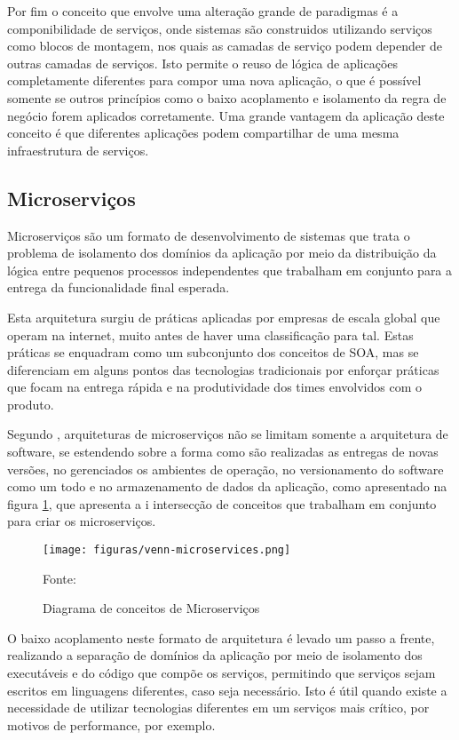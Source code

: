 Por fim o conceito que envolve uma alteração grande de paradigmas é a
componibilidade de serviços, onde sistemas são construidos utilizando serviços
como blocos de montagem, nos quais as camadas de serviço podem depender de
outras camadas de serviços. Isto permite o reuso de lógica de aplicações
completamente diferentes para compor uma nova aplicação, o que é possível
somente se outros princípios como o baixo acoplamento e isolamento da regra de
negócio forem aplicados corretamente. Uma grande vantagem da aplicação deste
conceito é que diferentes aplicações podem compartilhar de uma mesma
infraestrutura de serviços.

\subsection{Microserviços}

Microserviços são um formato de desenvolvimento de sistemas que trata o
problema de isolamento dos domínios da aplicação por meio da distribuição
da lógica entre pequenos processos independentes que trabalham em conjunto
para a entrega da funcionalidade final esperada.

Esta arquitetura surgiu de práticas aplicadas por empresas de escala global que
operam na internet, muito antes de haver uma classificação para tal. Estas
práticas se enquadram como um subconjunto dos conceitos de \ac{SOA}, mas se
diferenciam em alguns pontos das tecnologias tradicionais por enforçar práticas
que focam na entrega rápida e na produtividade dos times envolvidos com
o produto.

Segundo , arquiteturas de microserviços não se limitam
somente a arquitetura de software, se estendendo sobre a forma como são
realizadas as entregas de novas versões, no gerenciados os ambientes
de operação, no versionamento do software como um todo e no armazenamento de
dados da aplicação, como apresentado na figura \ref{fig:venn-microservices},
que apresenta a i intersecção de conceitos que trabalham em conjunto para criar
os microserviços.

\begin{figure}[H]
	\centering
	\caption{Diagrama de conceitos de Microserviços}
	\texttt{[image: figuras/venn-microservices.png]}

	\label{fig:venn-microservices}
	\footnotesize Fonte: 
\end{figure}

O baixo acoplamento neste formato de arquitetura é levado um passo a frente,
realizando a separação de domínios da aplicação por meio de isolamento dos
executáveis e do código que compõe os serviços, permitindo que serviços
sejam escritos em linguagens diferentes, caso seja necessário. Isto é útil
quando existe a necessidade de utilizar tecnologias diferentes em um
serviços mais crítico, por motivos de performance, por exemplo.

